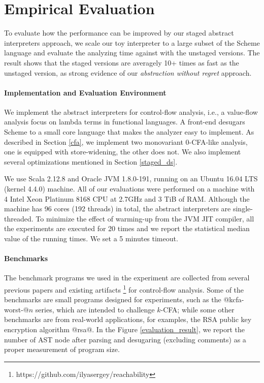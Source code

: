 \section{Empirical Evaluation} \label{evaluation}

To evaluate how the performance can be improved by our staged abstract interpreters
approach, we scale our toy interpreter to a large subset of the Scheme language
and evaluate the analyzing time against with the unstaged versions. The result
shows that the staged versions are averagely 10+ times as fast as the unstaged
version, as strong evidence of our \textit{abstraction without regret}
approach.

\paragraph{Implementation and Evaluation Environment}
We implement the abstract interpreters for control-flow analysis, i.e., a
value-flow analysis focus on lambda terms in functional languages. A front-end
desugars Scheme to a small core language that makes the analyzer easy to
implement. As described in Section \ref{cfa}, we implement two monovariant
0-CFA-like analysis, one is equipped with store-widening, the other does not.
We also implement several optimizations mentioned in Section \ref{staged_ds}.

We use Scala 2.12.8 and Oracle JVM 1.8.0-191, running on an Ubuntu 16.04 LTS
(kernel 4.4.0) machine. All of our evaluations were performed on a machine with 4 Intel
Xeon Platinum 8168 CPU at 2.7GHz and 3 TiB of RAM. Although the machine has 96
cores (192 threads) in total, the abstract interpreters are single-threaded.
To minimize the effect of warming-up from the JVM JIT compiler, all the
experiments are executed for 20 times and we report the statistical median value
of the running times. We set a 5 minutes timeout.

\paragraph{Benchmarks}
The benchmark programs we used in the experiment are collected from several
previous papers \cite{Johnson:2013:OAA:2500365.2500604, ashley:practical,
DBLP:journals/corr/abs-1102-3676} and existing artifacts
\footnote{https://github.com/ilyasergey/reachability} for control-flow analysis.
Some of the benchmarks are small programs designed for experiments, such as the
@kcfa-worst-@$n$ series, which are intended to challenge $k$-CFA; while some
other benchmarks are from real-world applications, for examples, the RSA public
key encryption algorithm @rsa@. In the Figure \ref{evaluation_result}, we report
the number of AST node after parsing and desugaring (excluding comments) as a
proper measurement of program size.

